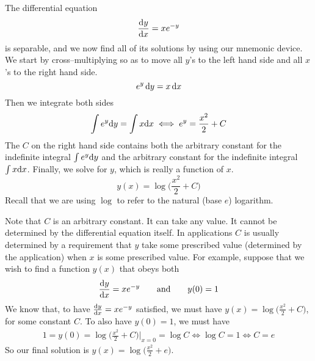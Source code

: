 \begin{eg}\label{eg:SDEsdeAA}
The differential equation
\begin{equation*}
\diff{y}{x} = xe^{-y}
\end{equation*}
is separable, and we now find all of its solutions by using our mnemonic
device. We start by cross--multiplying so as to move all $y$'s to the left
hand side and all $x$'s to the right hand side.
\begin{equation*}
e^y\,\mathrm{d}y = x\,\mathrm{d}x
\end{equation*}
Then we integrate both sides
\begin{equation*}
\int e^y\mathrm{d}y = \int x\mathrm{d}x
\iff e^y = \frac{x^2}{2}+C
\end{equation*}
The $C$ on the right hand side contains both the arbitrary constant
for the indefinite integral $\int e^y\mathrm{d}y$ and the arbitrary constant for
the indefinite integral  $\int x\mathrm{d}x$. Finally, we solve for $y$,
which is really a function of $x$.
\begin{equation*}
y(x) = \log\Big(\frac{x^2}{2}+C\Big)
\end{equation*}
Recall that we are using $\log$ to refer to the natural (base $e$)
logarithm.

Note that $C$ is an arbitrary constant. It can take any value. It cannot be
determined by the differential equation itself. In applications $C$ is usually
determined by a requirement that $y$ take some prescribed value (determined by the  application) when $x$ is some prescribed value. For example, suppose that we wish to find a function $y(x)$ that obeys both
\begin{equation*}
\diff{y}{x} = xe^{-y}\qquad\text{and}\qquad y(0)=1
\end{equation*}
We know that, to have $\diff{y}{x} = xe^{-y}$ satisfied, we must have
$y(x) = \log\big(\frac{x^2}{2}+C\big)$, for some constant $C$. To also have
$y(0)=1$, we must have
\begin{align*}
1=y(0)=\log\Big(\frac{x^2}{2}+C\Big)\bigg|_{x=0}=\log C
\iff \log C =1
\iff C=e
\end{align*}
So our final solution is $y(x) = \log\big(\frac{x^2}{2}+e\big)$.
\end{eg}



